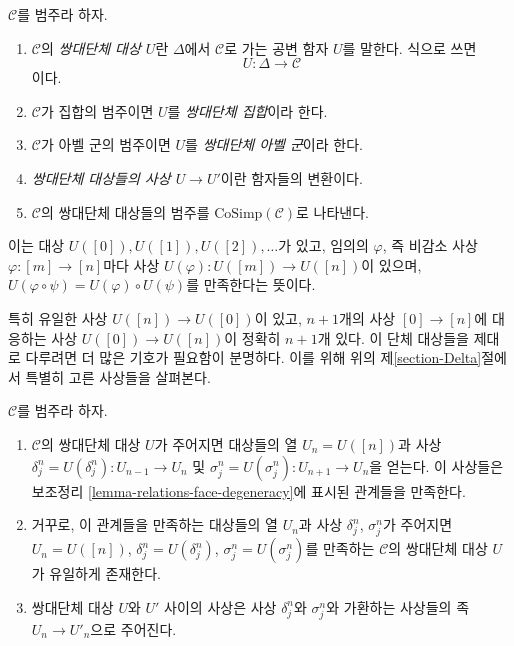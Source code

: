 \begin{definition}
\label{definition-cosimplicial-object}
$\mathcal{C}$를 범주라 하자.
\begin{enumerate}
\item $\mathcal{C}$의 {\it 쌍대단체 대상 $U$}란 $\Delta$에서
$\mathcal{C}$로 가는 공변 함자 $U$를 말한다. 식으로 쓰면
$$
U : \Delta \longrightarrow \mathcal{C}
$$
이다.
\item $\mathcal{C}$가 집합의 범주이면 $U$를
{\it 쌍대단체 집합}이라 한다.
\item $\mathcal{C}$가 아벨 군의 범주이면 $U$를
{\it 쌍대단체 아벨 군}이라 한다.
\item {\it 쌍대단체 대상들의 사상 $U \to U'$}이란 함자들의 변환이다.
\item {$\mathcal{C}$의 쌍대단체 대상들의 범주}를
$\text{CoSimp}(\mathcal{C})$로 나타낸다.
\end{enumerate}
\end{definition}

\noindent
이는 대상 $U([0]), U([1]), U([2]), \ldots$가 있고,
임의의 $\varphi$, 즉 비감소 사상 $\varphi : [m] \to [n]$마다 사상
$U(\varphi) : U([m]) \to U([n])$이 있으며,
$U(\varphi \circ \psi) = U(\varphi) \circ U(\psi)$를
만족한다는 뜻이다.

\medskip\noindent
특히 유일한 사상 $U([n]) \to U([0])$이 있고,
$n + 1$개의 사상 $[0] \to [n]$에 대응하는 사상
$U([0]) \to U([n])$이 정확히 $n + 1$개 있다.
이 단체 대상들을 제대로 다루려면 더 많은 기호가 필요함이 분명하다.
이를 위해 위의 제\ref{section-Delta}절에서 특별히 고른 사상들을 살펴본다.

\begin{lemma}
\label{lemma-characterize-cosimplicial-object}
$\mathcal{C}$를 범주라 하자.
\begin{enumerate}
\item $\mathcal{C}$의 쌍대단체 대상 $U$가 주어지면 대상들의 열
$U_n = U([n])$과 사상
$\delta^n_j = U(\delta^n_j) : U_{n - 1} \to U_n$ 및
$\sigma^n_j = U(\sigma^n_j) : U_{n + 1} \to U_n$을 얻는다.
이 사상들은 보조정리 \ref{lemma-relations-face-degeneracy}에 표시된
관계들을 만족한다.
\item 거꾸로, 이 관계들을 만족하는 대상들의 열 $U_n$과 사상
$\delta^n_j$, $\sigma^n_j$가 주어지면
$U_n = U([n])$, $\delta^n_j = U(\delta^n_j)$,
$\sigma^n_j = U(\sigma^n_j)$를 만족하는 $\mathcal{C}$의
쌍대단체 대상 $U$가 유일하게 존재한다.
\item 쌍대단체 대상 $U$와 $U'$ 사이의 사상은 사상
$\delta^n_j$와 $\sigma^n_j$와 가환하는 사상들의 족
$U_n \to U'_n$으로 주어진다.
\end{enumerate}
\end{lemma}

